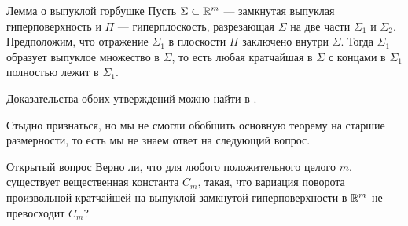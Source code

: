 \documentclass[a4paper,10pt]{article}
\begin{document}
\begin{thm}{Лемма о выпуклой горбушке}
Пусть $\Sigma\subset\mathbb{R}^m$ --- замкнутая выпуклая гиперповерхность и
$\Pi$ --- гиперплоскость, разрезающая $\Sigma$ на две части $\Sigma_1$ и $\Sigma_2$.
Предположим, что отражение $\Sigma_1$ в плоскости $\Pi$ заключено внутри  $\Sigma$.
Тогда $\Sigma_1$ образует выпуклое множество в $\Sigma$,
то есть любая кратчайшая в $\Sigma$ с концами в $\Sigma_1$ полностью лежит в $\Sigma_1$.
\end{thm}

Доказательства обоих утверждений можно найти в \cite{petrunin-orthodox}.

\medskip

Стыдно признаться, но мы не смогли обобщить основную теорему на старшие размерности,
то есть мы не знаем ответ на следующий вопрос.

\begin{thm}{Открытый вопрос}
Верно ли, что для любого положительного целого $m$,
существует вещественная константа $C_m$,
такая, что вариация поворота произвольной кратчайшей на выпуклой замкнутой гиперповерхности в $\mathbb{R}^m$ не превосходит $C_m$?
\end{thm}







\Addresses
\end{document}
